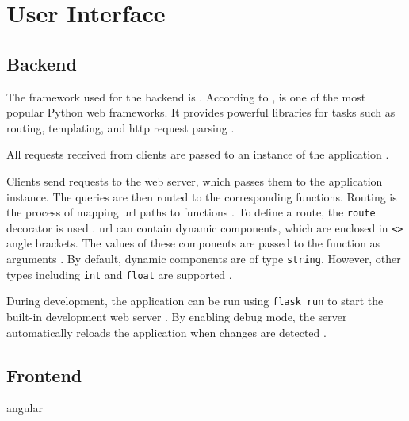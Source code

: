 \section{User Interface}\label{sec:ui}

\subsection{Backend}\label{subsec:backend}

The framework used for the backend is \flask{}.
According to \citeauthor{flask_book2015}, \flask{} is one of the most popular Python web frameworks.
It provides powerful libraries for tasks such as routing, templating, and \ac{http} request parsing \cite{flask_book2015}.

All requests received from clients are passed to an instance of the \flask{} application \cite{flask_book2018}.

Clients send requests to the web server, which passes them to the \flask{} application instance.
The queries are then routed to the corresponding functions.
Routing is the process of mapping \ac{url} paths to functions \cite{flask_book2018}.
To define a route, the \texttt{route} decorator is used \cite{flask_book2018}.
\acs{url} can contain dynamic components, which are enclosed in \texttt{<>} angle brackets.
The values of these components are passed to the function as arguments \cite{flask_book2018}.
By default, dynamic components are of type \texttt{string}.
However, other types including \texttt{int} and \texttt{float} are supported \cite{flask_book2018}.

During development, the \flask{} application can be run using \texttt{flask run} to start the built-in development web server \cite{flask_book2018}.
By enabling debug mode, the server automatically reloads the application when changes are detected \cite{flask_book2018}.

\cite{mvc_flask2019}
\cite{flask2015}
\cite{flask_book2015}
\cite{flask_book2018}
\cite{flask2018}

\subsection{Frontend}\label{subsec:frontend}
angular